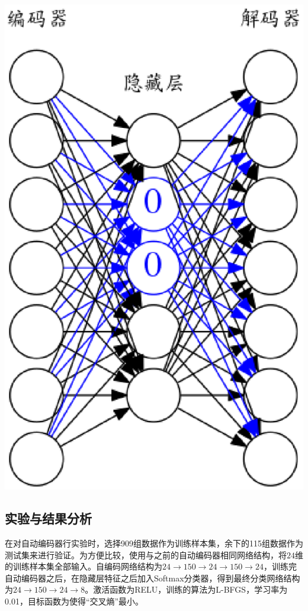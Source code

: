 \documentclass{ctacn}%
\begin{document}
\begin{multicols}{2}
\begin{center}
	\includegraphics[scale=0.14, trim=0 0 0 0]{figs/denoised_autoencoder}\\
	\label{fig8}
\end{center}

\subsection{实验与结果分析}

在对自动编码器行实验时，选择909组数据作为训练样本集，余下的115组数据作为测试集来进行验证。为方便比较，使用与之前的自动编码器相同网络结构，将$24$维的训练样本集全部输入。自编码网络结构为$24\rightarrow150\rightarrow24\rightarrow150\rightarrow24$，训练完自动编码器之后，在隐藏层特征之后加入Softmax分类器，得到最终分类网络结构为$24\rightarrow150\rightarrow24\rightarrow8$。激活函数为RELU，训练的算法为L-BFGS，学习率为0.01，目标函数为使得“交叉熵”最小。


\end{multicols}
\end{document}
